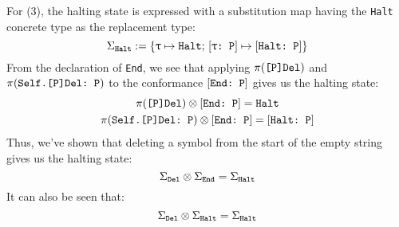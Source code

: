 \documentclass[../generics]{subfiles}
\begin{document}
For (3), the halting state is expressed with a substitution map having the \texttt{Halt} concrete type as the replacement type:
\[\Sigma_{\texttt{Halt}} := \{\texttt{$\uptau$} \mapsto \texttt{Halt};\,[\texttt{$\uptau$:~P}] \mapsto [\texttt{Halt:~P}]\}\]
From the declaration of \texttt{End}, we see that applying $\pi(\texttt{[P]Del})$ and $\pi(\texttt{Self.[P]Del:~P})$ to the conformance $[\texttt{End:~P}]$ gives us the halting state:
\begin{gather*}
\pi(\texttt{[P]Del})\otimes[\texttt{End:~P}]=\texttt{Halt}\\
\pi(\texttt{Self.[P]Del:~P})\otimes[\texttt{End:~P}]=[\texttt{Halt:~P}]
\end{gather*}
Thus, we've shown that deleting a symbol from the start of the empty string gives us the halting state:
\[\Sigma_{\texttt{Del}}\otimes\Sigma_{\texttt{End}}=\Sigma_{\texttt{Halt}}\]
It can also be seen that:
\[\Sigma_{\texttt{Del}}\otimes\Sigma_{\texttt{Halt}}=\Sigma_{\texttt{Halt}}\]
\end{document}
